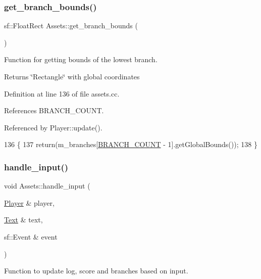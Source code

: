\subsubsection{\texorpdfstring{get\+\_\+branch\+\_\+bounds()}{get\_branch\_bounds()}}
{\footnotesize\ttfamily sf\+::\+Float\+Rect Assets\+::get\+\_\+branch\+\_\+bounds (\begin{DoxyParamCaption}{ }\end{DoxyParamCaption})}



Function for getting bounds of the lowest branch. 

\begin{DoxyReturn}{Returns}
\char`\"{}\+Rectangle\char`\"{} with global coordinates 
\end{DoxyReturn}


Definition at line 136 of file assets.\+cc.



References B\+R\+A\+N\+C\+H\+\_\+\+C\+O\+U\+NT.



Referenced by Player\+::update().


\begin{DoxyCode}
136                                       \{
137     \textcolor{keywordflow}{return}(m\_branches[\hyperlink{assets_8h_a21bfb121481880074762e53e6ecef7c0}{BRANCH\_COUNT} - 1].getGlobalBounds());
138 \}
\end{DoxyCode}
\mbox{\label{class_assets_aab62425b0c76418a434cccac038821c4}} 
\subsubsection{\texorpdfstring{handle\+\_\+input()}{handle\_input()}}
{\footnotesize\ttfamily void Assets\+::handle\+\_\+input (\begin{DoxyParamCaption}\item[{\hyperlink{class_player}{Player} \&}]{player,  }\item[{\hyperlink{class_text}{Text} \&}]{text,  }\item[{sf\+::\+Event \&}]{event }\end{DoxyParamCaption})}



Function to update log, score and branches based on input. 


